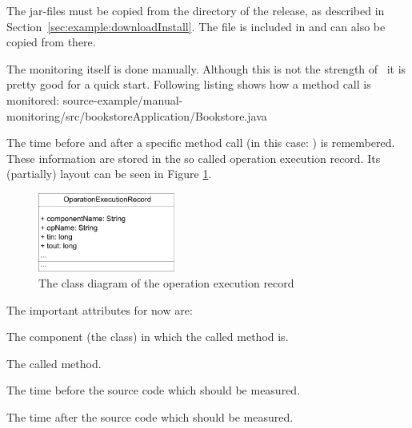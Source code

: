 \noindent The \Kieker{} jar-files must be copied from the  directory %
of the \Kieker{} release, as described in Section~\ref{sec:example:downloadInstall}. %
The file  is included in  %
and can also be copied from there.

The monitoring itself is done manually. Although this is not the strength of \Kieker\ it is pretty good for a quick start. Following listing shows how a method call is monitored:
\setJavaCodeListing
%
{source-example/manual-monitoring/src/bookstoreApplication/Bookstore.java}
 
\noindent The time before and after a specific method call (in this case: ) is remembered. These information are stored in the so called operation execution record. Its (partially) layout can be seen in Figure \ref{Figure:OperationExecutionRecordClassDiagram}.

\begin{figure}[H]
\begin{centering}
\includegraphics[width=0.4\textwidth]{images/OpExRecClassDiagram}
\caption{The class diagram of the operation execution record}
\label{Figure:OperationExecutionRecordClassDiagram}
\end{centering}
\end{figure}

\noindent The important attributes for now are:
\begin{compactitem}
\item {} The component (the class) in which the called method is.
\item {} The called method.
\item {} The time before the source code which should be measured.
\item {} The time after the source code which should be measured.
\end{compactitem}

